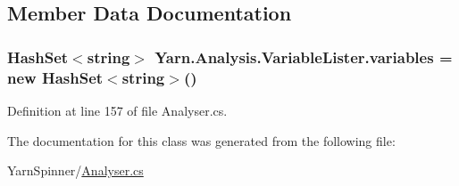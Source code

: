 \subsection{Member Data Documentation}
\hypertarget{a00189_a64ed6c3394c474b6cf5804a35f560746}{
\subsubsection[{variables}]{\setlength{\rightskip}{0pt plus 5cm}Hash\-Set$<$string$>$ Yarn.\-Analysis.\-Variable\-Lister.\-variables = new Hash\-Set$<$string$>$()\hspace{0.3cm}{\ttfamily [private]}}}\label{a00189_a64ed6c3394c474b6cf5804a35f560746}


Definition at line 157 of file Analyser.\-cs.



The documentation for this class was generated from the following file\-:\begin{DoxyCompactItemize}
\item 
Yarn\-Spinner/\hyperlink{a00302}{Analyser.\-cs}\end{DoxyCompactItemize}
